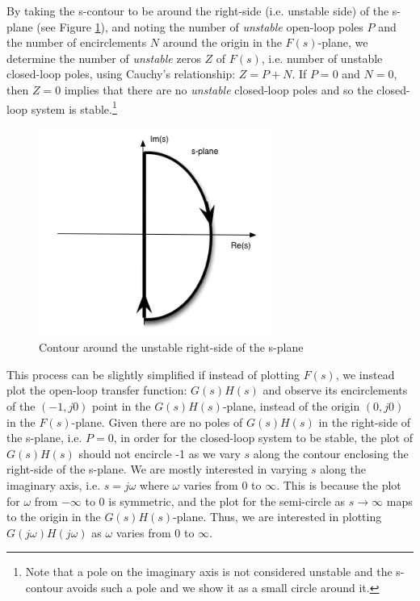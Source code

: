 \documentclass{article}
\begin{document}
By taking the s-contour to be around the right-side (i.e. unstable side) of the s-plane
(see Figure \ref{fig:s-contour}),
and noting the number of {\em unstable} open-loop poles $P$
and the number of encirclements $N$ around the origin in the $F(s)$-plane, we determine 
the number of {\em unstable} zeros $Z$ of $F(s)$, i.e. number of unstable closed-loop poles,
using Cauchy's relationship: $Z = P + N$.
If $P = 0$ and $N = 0$, then $Z = 0$ implies that there are no {\em unstable} closed-loop poles
and so the closed-loop system is stable.\footnote{
Note that a pole on the imaginary axis is not considered unstable and
the s-contour avoids such a pole and we show it as a small circle around it.
}
\begin{figure}[htbp]
   \centering
   \includegraphics[width=3in]{figures/s-contour.jpg} %
   \caption{Contour around the unstable right-side of the s-plane}
   \label{fig:s-contour}
\end{figure}

This process can be slightly simplified if instead of plotting $F(s)$,
we instead plot the open-loop transfer function: $G(s)H(s)$ and 
observe its encirclements of the $(-1, j 0)$ point in the $G(s)H(s)$-plane,
instead of  the origin $(0, j 0)$ in the $F(s)$-plane.
Given there are no poles of $G(s)H(s)$ in the right-side of the s-plane, i.e. $P=0$,
in order for the closed-loop system to be stable,
the plot of  $G(s)H(s)$ should not encircle -1 as we vary $s$ along the contour enclosing
the right-side of the s-plane.
We are mostly interested in varying $s$ along the imaginary axis,
i.e. $s = j \omega$ where $\omega$ varies from 0 to $\infty$.
This is because the plot for $\omega$ from $- \infty$ to 0 is symmetric,
and the plot for the semi-circle as $s \rightarrow \infty$ maps to the origin in the $G(s)H(s)$-plane.
Thus, we are interested in plotting $G(j \omega) H(j \omega)$
as $\omega$ varies from 0 to $\infty$.
\end{document}
